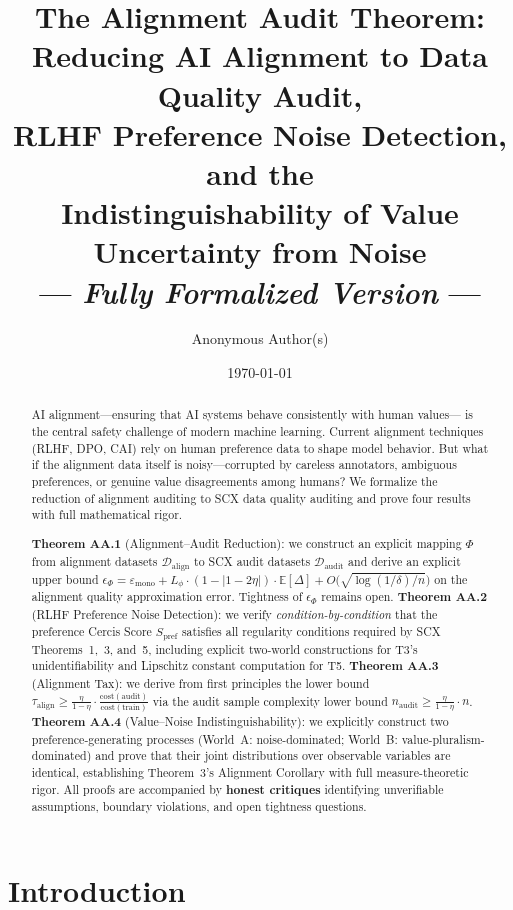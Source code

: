 \documentclass[12pt,a4paper]{article}
\title{\bfseries The Alignment Audit Theorem:\\
Reducing AI Alignment to Data Quality Audit,\\
RLHF Preference Noise Detection, and the\\
Indistinguishability of Value Uncertainty from Noise\\
--- \emph{Fully Formalized Version} ---}
\author{Anonymous Author(s)}
\date{\today}
\newcommand{\E}{\mathbb{E}}
\newcommand{\cD}{\mathcal{D}}
\begin{document}
\maketitle

\begin{abstract}
AI alignment---ensuring that AI systems behave consistently with human values---
is the central safety challenge of modern machine learning.  Current alignment
techniques (RLHF, DPO, CAI) rely on human preference data to shape model
behavior.  But what if the alignment data itself is noisy---corrupted by
careless annotators, ambiguous preferences, or genuine value disagreements
among humans?  We formalize the reduction of alignment auditing to SCX data
quality auditing and prove four results with full mathematical rigor.

\textbf{Theorem AA.1} (Alignment--Audit Reduction): we construct an explicit
mapping $\Phi$ from alignment datasets $\cD_{\mathrm{align}}$ to SCX audit
datasets $\cD_{\mathrm{audit}}$ and derive an explicit upper bound
$\epsilon_\Phi = \varepsilon_{\mathrm{mono}} + L_\phi \cdot (1-|1-2\eta|)
\cdot \E[\Delta] + O\big(\sqrt{\log(1/\delta)/n}\big)$ on the alignment
quality approximation error.  Tightness of $\epsilon_\Phi$ remains open.
\textbf{Theorem AA.2} (RLHF Preference Noise Detection): we verify
\emph{condition-by-condition} that the preference Cercis Score
$S_{\mathrm{pref}}$ satisfies all regularity conditions required by SCX
Theorems~1,~3, and~5, including explicit two-world constructions for T3's
unidentifiability and Lipschitz constant computation for T5.
\textbf{Theorem AA.3} (Alignment Tax): we derive from first principles the
lower bound $\tau_{\mathrm{align}} \geq \frac{\eta}{1-\eta}\cdot
\frac{\mathrm{cost}(\mathrm{audit})}{\mathrm{cost}(\mathrm{train})}$ via the
audit sample complexity lower bound $n_{\mathrm{audit}} \geq
\frac{\eta}{1-\eta}\cdot n$.  \textbf{Theorem AA.4} (Value--Noise
Indistinguishability): we explicitly construct two preference-generating
processes (World~A: noise-dominated; World~B: value-pluralism-dominated) and
prove that their joint distributions over observable variables are identical,
establishing Theorem~3's Alignment Corollary with full measure-theoretic
rigor.  All proofs are accompanied by \textbf{honest critiques} identifying
unverifiable assumptions, boundary violations, and open tightness questions.
\end{abstract}

\section{Introduction}
\end{document}

